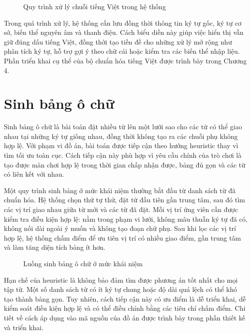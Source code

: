 ﻿\documentclass[../DoAn.tex]{subfiles}
\begin{document}
\begin{figure}[H]
\centering
\resizebox{0.90\textwidth}{!}{}
\caption{Quy trình xử lý chuỗi tiếng Việt trong hệ thống}
\label{fig:quy-trinh-xu-ly-tieng-viet}
\end{figure}

Trong quá trình xử lý, hệ thống cần lưu đồng thời thông tin ký tự gốc, ký tự cơ sở, biến thể nguyên âm và thanh điệu. Cách biểu diễn này giúp việc hiển thị vẫn giữ đúng dấu tiếng Việt, đồng thời tạo tiền đề cho những xử lý mở rộng như phân tích ký tự, hỗ trợ gợi ý theo chữ cái hoặc kiểm tra các biến thể nhập liệu. Phần triển khai cụ thể của bộ chuẩn hóa tiếng Việt được trình bày trong Chương 4.

\section{Sinh bảng ô chữ}
Sinh bảng ô chữ là bài toán đặt nhiều từ lên một lưới sao cho các từ có thể giao nhau tại những ký tự giống nhau, đồng thời không tạo ra các chuỗi phụ không hợp lệ. Với phạm vi đồ án, bài toán được tiếp cận theo hướng heuristic thay vì tìm tối ưu toàn cục. Cách tiếp cận này phù hợp vì yêu cầu chính của trò chơi là tạo được màn chơi hợp lệ trong thời gian chấp nhận được, bảng đủ gọn và các từ có liên kết với nhau.

Một quy trình sinh bảng ở mức khái niệm thường bắt đầu từ danh sách từ đã chuẩn hóa. Hệ thống chọn thứ tự thử, đặt từ đầu tiên gần trung tâm, sau đó tìm các vị trí giao nhau giữa từ mới và các từ đã đặt. Mỗi vị trí ứng viên cần được kiểm tra điều kiện hợp lệ: nằm trong phạm vi lưới, không mâu thuẫn ký tự đã có, không nối dài ngoài ý muốn và không tạo đoạn chữ phụ. Sau khi lọc các vị trí hợp lệ, hệ thống chấm điểm để ưu tiên vị trí có nhiều giao điểm, gần trung tâm và làm tăng diện tích bảng ít hơn.

\begin{figure}[H]
\centering
\resizebox{0.62\textwidth}{!}{}
\caption{Luồng sinh bảng ô chữ ở mức khái niệm}
\label{fig:luong-sinh-bang-o-chu}
\end{figure}

Hạn chế của heuristic là không bảo đảm tìm được phương án tốt nhất cho mọi tập từ. Một số danh sách từ có ít ký tự chung hoặc độ dài quá lệch có thể khó tạo thành bảng gọn. Tuy nhiên, cách tiếp cận này có ưu điểm là dễ triển khai, dễ kiểm soát điều kiện hợp lệ và có thể điều chỉnh bằng các tiêu chí chấm điểm. Chi tiết về cách áp dụng vào mã nguồn của đồ án được trình bày trong phần thiết kế và triển khai.
\end{document}
